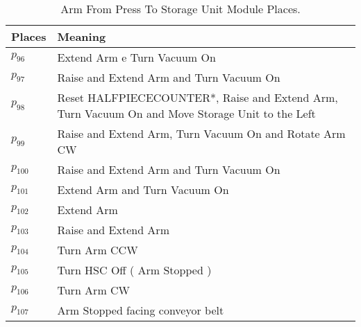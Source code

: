 \begin{table}[H]
\caption{Arm From Press To Storage Unit Module Places.}
\centering
\begin{tabular}{M{5cm}M{10cm}}
Places & Meaning\\
\hline
\hyperlink{partialNet:p96}{\hypertarget{partialTable:p96}{$p_{96}$}} & Extend Arm e Turn Vacuum On\\
\hyperlink{partialNet:p97}{\hypertarget{partialTable:p97}{$p_{97}$}} & Raise and Extend Arm and Turn Vacuum On\\
\hyperlink{partialNet:p98}{\hypertarget{partialTable:p98}{$p_{98}$}} & Reset HALFPIECECOUNTER*, Raise and Extend Arm, Turn Vacuum On and Move Storage Unit to the Left\\
\hyperlink{partialNet:p99}{\hypertarget{partialTable:p99}{$p_{99}$}} & Raise and Extend Arm, Turn Vacuum On and Rotate Arm CW\\
\hyperlink{partialNet:p100}{\hypertarget{partialTable:p100}{$p_{100}$}} & Raise and Extend Arm and Turn Vacuum On\\
\hyperlink{partialNet:p101}{\hypertarget{partialTable:p101}{$p_{101}$}} & Extend Arm and Turn Vacuum On\\
\hyperlink{partialNet:p102}{\hypertarget{partialTable:p102}{$p_{102}$}} & Extend Arm\\
\hyperlink{partialNet:p103}{\hypertarget{partialTable:p103}{$p_{103}$}} & Raise and Extend Arm\\
\hyperlink{partialNet:p104}{\hypertarget{partialTable:p104}{$p_{104}$}} & Turn Arm CCW\\
\hyperlink{partialNet:p105}{\hypertarget{partialTable:p105}{$p_{105}$}} & Turn HSC Off ( Arm Stopped )\\
\hyperlink{partialNet:p106}{\hypertarget{partialTable:p106}{$p_{106}$}} & Turn Arm CW\\
\hyperlink{partialNet:p107}{\hypertarget{partialTable:p107}{$p_{107}$}} & Arm Stopped facing conveyor belt\\
\end{tabular}
\end{table}
